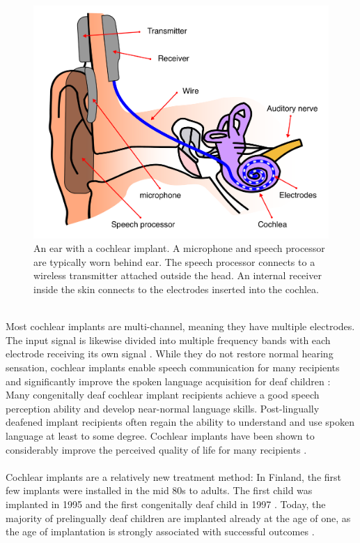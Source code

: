 \documentclass[english, 12pt, a4paper, pdftex, elec, utf8]{aaltothesis}
\begin{document}
\begin{figure}[h]
	\centering 
	\includegraphics[width=\textwidth]{implant.pdf}
	\vspace{0.5mm}
	\caption{An ear with a cochlear implant. A microphone and speech processor are typically worn behind ear. The speech processor connects to a wireless transmitter attached outside the head. An internal receiver inside the skin connects to the electrodes inserted into the cochlea. \cite{moore2007cochlear, peterson2010cochlear}}
	\label{fig:implant} 
\end{figure} \\
Most cochlear implants are multi-channel, meaning they have multiple electrodes. The input signal is likewise divided into multiple frequency bands with each electrode receiving its own signal \cite{moore2007cochlear, friesen2001speech}. While they do not restore normal hearing sensation, cochlear implants enable speech communication for many recipients and significantly improve the spoken language acquisition for deaf children \cite{stacey2006hearing, raino2012sisakorvaistutteen}: Many congenitally deaf cochlear implant recipients achieve a good speech perception ability and develop near-normal language skills. Post-lingually deafened implant recipients often regain the ability to understand and use spoken language at least to some degree. Cochlear implants have been shown to considerably improve the perceived quality of life for many recipients \cite{blomberg2012sisakorvaistutetta}. \\\\
Cochlear implants are a relatively new treatment method: In Finland, the first few implants were installed in the mid 80s to adults. The first child was implanted in 1995 and the first congenitally deaf child in 1997 \cite{raino2012sisakorvaistutteen}. Today, the majority of prelingually deaf children are implanted already at the age of one, as the age of implantation is strongly associated with successful outcomes \cite{peterson2010cochlear, stacey2006hearing, raino2012sisakorvaistutteen}.
\end{document}
